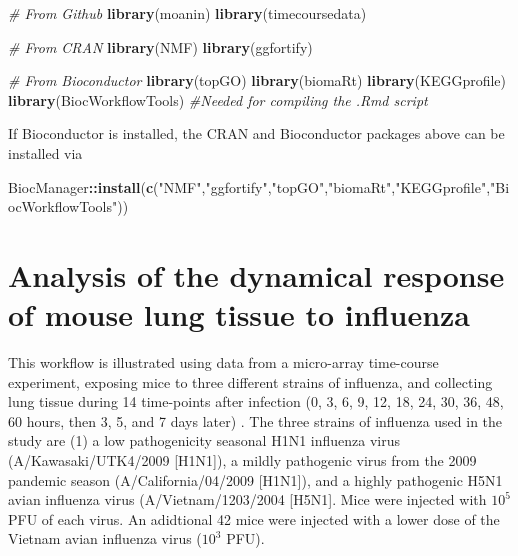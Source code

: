 \documentclass[9pt,a4paper,]{extarticle}
\newenvironment{Shaded}{\begin{snugshade}}{\end{snugshade}}
\newcommand{\CommentTok}[1]{\textcolor[rgb]{0.56,0.35,0.01}{\textit{#1}}}
\newcommand{\KeywordTok}[1]{\textcolor[rgb]{0.13,0.29,0.53}{\textbf{#1}}}
\newcommand{\NormalTok}[1]{#1}
\newcommand{\OperatorTok}[1]{\textcolor[rgb]{0.81,0.36,0.00}{\textbf{#1}}}
\newcommand{\StringTok}[1]{\textcolor[rgb]{0.31,0.60,0.02}{#1}}
\begin{document}
\begin{Shaded}
\begin{Highlighting}[]
\CommentTok{# From Github}
\KeywordTok{library}\NormalTok{(moanin)}
\KeywordTok{library}\NormalTok{(timecoursedata)}

\CommentTok{# From CRAN}
\KeywordTok{library}\NormalTok{(NMF)}
\KeywordTok{library}\NormalTok{(ggfortify)}

\CommentTok{# From Bioconductor}
\KeywordTok{library}\NormalTok{(topGO)}
\KeywordTok{library}\NormalTok{(biomaRt)}
\KeywordTok{library}\NormalTok{(KEGGprofile)}
\KeywordTok{library}\NormalTok{(BiocWorkflowTools) }\CommentTok{#Needed for compiling the .Rmd script}
\end{Highlighting}
\end{Shaded}

If Bioconductor is installed, the CRAN and Bioconductor packages above can be installed via

\begin{Shaded}
\begin{Highlighting}[]
\NormalTok{BiocManager}\OperatorTok{::}\KeywordTok{install}\NormalTok{(}\KeywordTok{c}\NormalTok{(}\StringTok{"NMF"}\NormalTok{,}\StringTok{"ggfortify"}\NormalTok{,}\StringTok{"topGO"}\NormalTok{,}\StringTok{"biomaRt"}\NormalTok{,}\StringTok{"KEGGprofile"}\NormalTok{,}\StringTok{"BiocWorkflowTools"}\NormalTok{))}
\end{Highlighting}
\end{Shaded}

\hypertarget{analysis-of-the-dynamical-response-of-mouse-lung-tissue-to-influenza}{%
\section{Analysis of the dynamical response of mouse lung tissue to influenza}\label{analysis-of-the-dynamical-response-of-mouse-lung-tissue-to-influenza}}

This workflow is illustrated using data from a micro-array time-course
experiment, exposing mice to three different strains of influenza, and
collecting lung tissue during 14 time-points after infection (0, 3, 6, 9, 12,
18, 24, 30, 36, 48, 60 hours, then 3, 5, and 7 days later)
\citep{shoemaker:ultrasensitive}. The three strains of influenza used in the
study are (1) a low pathogenicity seasonal H1N1 influenza virus
(A/Kawasaki/UTK4/2009 {[}H1N1{]}), a mildly pathogenic virus from the 2009
pandemic season (A/California/04/2009 {[}H1N1{]}), and a highly pathogenic H5N1
avian influenza virus (A/Vietnam/1203/2004 {[}H5N1{]}. Mice were injected with
\(10^5\) PFU of each virus. An adidtional 42 mice were injected with a lower dose
of the Vietnam avian influenza virus (\(10^3\) PFU).
\end{document}
